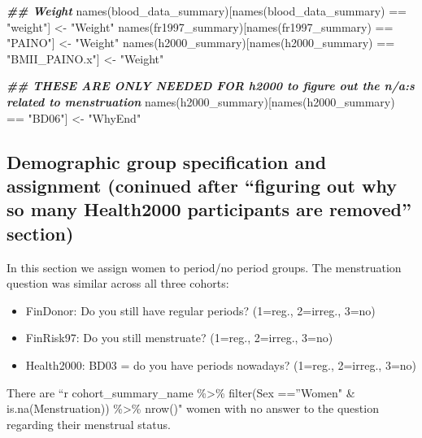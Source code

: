 \documentclass[
]{article}
\newenvironment{Shaded}{\begin{snugshade}}{\end{snugshade}}
\newcommand{\DocumentationTok}[1]{\textcolor[rgb]{0.56,0.35,0.01}{\textbf{\textit{#1}}}}
\newcommand{\FunctionTok}[1]{\textcolor[rgb]{0.00,0.00,0.00}{#1}}
\newcommand{\NormalTok}[1]{#1}
\newcommand{\OtherTok}[1]{\textcolor[rgb]{0.56,0.35,0.01}{#1}}
\newcommand{\SpecialCharTok}[1]{\textcolor[rgb]{0.00,0.00,0.00}{#1}}
\newcommand{\StringTok}[1]{\textcolor[rgb]{0.31,0.60,0.02}{#1}}
\providecommand{\tightlist}{%
  \setlength{\itemsep}{0pt}\setlength{\parskip}{0pt}}
\begin{document}
\begin{Shaded}
\begin{Highlighting}[]
\DocumentationTok{\#\# Weight}
\FunctionTok{names}\NormalTok{(blood\_data\_summary)[}\FunctionTok{names}\NormalTok{(blood\_data\_summary) }\SpecialCharTok{==} \StringTok{"weight"}\NormalTok{] }\OtherTok{\textless{}{-}} \StringTok{"Weight"}
\FunctionTok{names}\NormalTok{(fr1997\_summary)[}\FunctionTok{names}\NormalTok{(fr1997\_summary) }\SpecialCharTok{==} \StringTok{"PAINO"}\NormalTok{] }\OtherTok{\textless{}{-}} \StringTok{"Weight"}
\FunctionTok{names}\NormalTok{(h2000\_summary)[}\FunctionTok{names}\NormalTok{(h2000\_summary) }\SpecialCharTok{==} \StringTok{"BMII\_PAINO.x"}\NormalTok{] }\OtherTok{\textless{}{-}} \StringTok{"Weight"}

\DocumentationTok{\#\# THESE ARE ONLY NEEDED FOR h2000 to figure out the n/a:s related to menstruation}
\FunctionTok{names}\NormalTok{(h2000\_summary)[}\FunctionTok{names}\NormalTok{(h2000\_summary) }\SpecialCharTok{==} \StringTok{"BD06"}\NormalTok{] }\OtherTok{\textless{}{-}} \StringTok{"WhyEnd"}
\end{Highlighting}
\end{Shaded}

\hypertarget{demographic-group-specification-and-assignment-coninued-after-figuring-out-why-so-many-health2000-participants-are-removed-section}{%
\subsection{Demographic group specification and assignment (coninued
after ``figuring out why so many Health2000 participants are removed''
section)}\label{demographic-group-specification-and-assignment-coninued-after-figuring-out-why-so-many-health2000-participants-are-removed-section}}

In this section we assign women to period/no period groups. The
menstruation question was similar across all three cohorts:

\begin{itemize}
\tightlist
\item
  FinDonor: Do you still have regular periods? (1=reg., 2=irreg., 3=no)
\item
  FinRisk97: Do you still menstruate? (1=reg., 2=irreg., 3=no)
\item
  Health2000: BD03 = do you have periods nowadays? (1=reg., 2=irreg.,
  3=no)
\end{itemize}

There are ``r cohort\_summary\_name \%\textgreater\% filter(Sex
==''Women" \& is.na(Menstruation)) \%\textgreater\% nrow()" women with
no answer to the question regarding their menstrual status.
\end{document}
